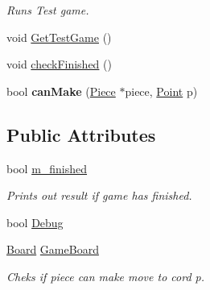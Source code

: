 \begin{DoxyCompactItemize}
\begin{DoxyCompactList}\small\item\em Runs Test game. \end{DoxyCompactList}\item 
void \hyperlink{class_game_a1f47238d93728540edb7940a80a9db89}{Get\-Test\-Game} ()
\item 
void \hyperlink{class_game_ae5be70ea28f2ec151cd93e86086f23a9}{check\-Finished} ()
\item 
\hypertarget{class_game_a37edad1c1ded84b1735653f809ccb585}{bool {\bfseries can\-Make} (\hyperlink{class_piece}{Piece} $\ast$piece, \hyperlink{struct_point}{Point} p)}\label{class_game_a37edad1c1ded84b1735653f809ccb585}

\end{DoxyCompactItemize}
\subsection*{Public Attributes}
\begin{DoxyCompactItemize}
\item 
\hypertarget{class_game_aee0b70deb19422d35b2061beb339bdf8}{bool \hyperlink{class_game_aee0b70deb19422d35b2061beb339bdf8}{m\-\_\-finished}}\label{class_game_aee0b70deb19422d35b2061beb339bdf8}

\begin{DoxyCompactList}\small\item\em Prints out result if game has finished. \end{DoxyCompactList}\item 
bool \hyperlink{class_game_ad79740c2d2fa299cf322bf6ea322d9aa}{Debug}
\item 
\hypertarget{class_game_aeb67bc4fc06221330cfd7c862c85b66d}{\hyperlink{class_board}{Board} \hyperlink{class_game_aeb67bc4fc06221330cfd7c862c85b66d}{Game\-Board}}\label{class_game_aeb67bc4fc06221330cfd7c862c85b66d}

\begin{DoxyCompactList}\small\item\em Cheks if piece can make move to cord p. \end{DoxyCompactList}\end{DoxyCompactItemize}
